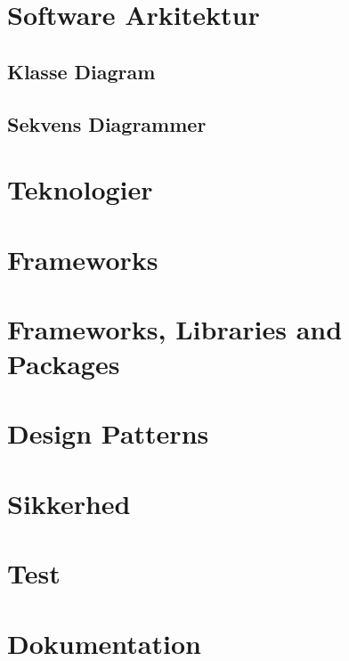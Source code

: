 \section{Software Arkitektur}

\subsection{Klasse Diagram}

\subsection{Sekvens Diagrammer}

\section{Teknologier}

\section{Frameworks}

\section{Frameworks, Libraries and Packages}



\section{Design Patterns}

\section{Sikkerhed}

\section{Test}

\section{Dokumentation}
